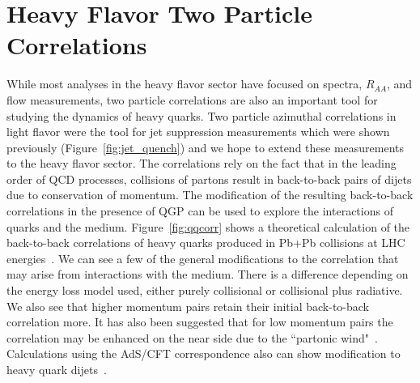 \section{Heavy Flavor Two Particle Correlations}

While most analyses in the heavy flavor sector have focused on spectra, $R_{AA}$, and flow measurements, two particle correlations are also an important tool for studying the dynamics of heavy quarks. Two particle azimuthal correlations in light flavor were the tool for jet suppression measurements which were shown previously (Figure~\ref{fig:jet_quench}) and we hope to extend these measurements to the heavy flavor sector. The correlations rely on the fact that in the leading order of QCD processes, collisions of partons result in back-to-back pairs of dijets due to conservation of momentum. The modification of the resulting back-to-back correlations in the presence of QGP can be used to explore the interactions of quarks and the medium. Figure~\ref{fig:qqcorr} shows a theoretical calculation of the back-to-back correlations of heavy quarks produced in Pb+Pb collisions at LHC energies~\cite{qqazi}. We can see a few of the general modifications to the correlation that may arise from interactions with the medium. There is a difference depending on the energy loss model used, either purely collisional or collisional plus radiative. We also see that higher momentum pairs retain their initial back-to-back correlation more. It has also been suggested that for low momentum pairs the correlation may be enhanced on the near side due to the ``partonic wind"~\cite{partwind}. Calculations using the AdS/CFT correspondence also can show modification to heavy quark dijets~\cite{adscft}.

